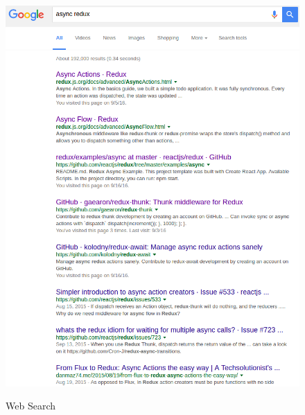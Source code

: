 \documentclass[11pt]{article}
\begin{document}
\begin{figure}[h]
	\centering
	{\includegraphics[scale=0.5]{googleWWWSearch.png}}
	\caption{Web Search}
	\label{fig:wwwsearch}
\end{figure}
\end{document}
